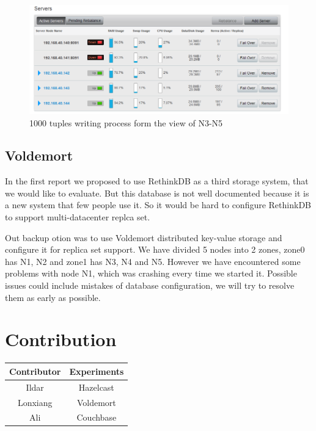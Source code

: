 \documentclass[a4paper]{article}
\begin{document}
\begin{figure}[H]
	\centering
	\includegraphics[width=\textwidth]{partition2}
	\caption{1000 tuples writing process form the view of N3-N5}
	\label{fig:partition2}
\end{figure}

\subsection{Voldemort}

In the first report we proposed to use RethinkDB as a third storage system, that we would like to evaluate. But this database is not well documented because it is a new system that few people use it. So it would be hard to configure RethinkDB to support multi-datacenter replca set.

Out backup otion was to use Voldemort distributed key-value storage and configure it for replica set support. We have divided 5 nodes into 2 zones, zone0 has N1, N2 and zone1 has N3, N4 and N5.  However we have encountered some problems with node N1, which was crashing every time we started it.
Possible issues could include mistakes of database configuration, we will try to resolve them as early as possible.

\section*{Contribution}

\begin{table}[hb]
	\centering
	\begin{tabular}{|c|c|}
		\hline
		\rowcolor{light-gray} \textbf{Contributor} & \textbf{Experiments} \\ \hline
		Ildar & Hazelcast  \\ \hline
		Lonxiang & Voldemort  \\ \hline
		Ali & Couchbase  \\ \hline
	\end{tabular}
\end{table}
\end{document}
